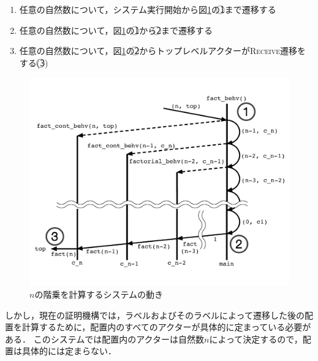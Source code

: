 
\begin{enumerate}
\item 任意の自然数について，システム実行開始から図\ref{img:conclusion:fact}の\textcircled{\scriptsize 1}まで遷移する
\item 任意の自然数について，図\ref{img:conclusion:fact}の\textcircled{\scriptsize 1}から\textcircled{\scriptsize 2}まで遷移する
\item 任意の自然数について，図\ref{img:conclusion:fact}の\textcircled{\scriptsize 2}からトップレベルアクターが\textsc{Receive}遷移をする(\textcircled{\scriptsize 3})
\end{enumerate}

\begin{figure}[tp]
  \centering
  \includegraphics[width=16cm]{./img/conclusion/fact_n.pdf}
  \caption{$n$の階乗を計算するシステムの動き}\label{img:conclusion:fact}
\end{figure}

しかし，現在の証明機構では，ラベルおよびそのラベルによって遷移した後の配置を計算するために，配置内のすべてのアクターが具体的に定まっている必要がある．
このシステムでは配置内のアクターは自然数$n$によって決定するので，配置は具体的には定まらない．

